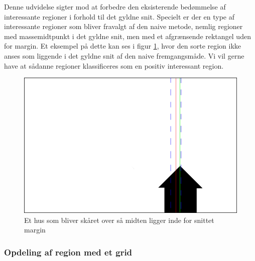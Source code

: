 {
Denne udvidelse sigter mod at forbedre den eksisterende bedømmelse af
interessante regioner i forhold til det gyldne snit. Specielt er der
en type af interessante regioner som bliver fravalgt af den naive
metode, nemlig regioner med massemidtpunkt i det gyldne snit, men med et
afgrænsende rektangel uden for margin. Et eksempel på dette kan ses i
figur \ref{hus}, hvor den sorte region ikke anses som liggende i det
gyldne snit af den naive fremgangsmåde. Vi vil gerne have at sådanne
regioner klassificeres som en positiv interessant region.

\begin{figure}[h]
	\begin{center}
		\includegraphics[scale=0.3,angle=0]{afsnit/vores_implementation/billeder/udvidet_loesning/husworks.png}
	\end{center}
	\caption[]{Et hus som bliver skåret over så midten ligger inde for snittet margin}
	\label{hus}
\end{figure}


\subsubsection{Opdeling af region med et grid}

}

